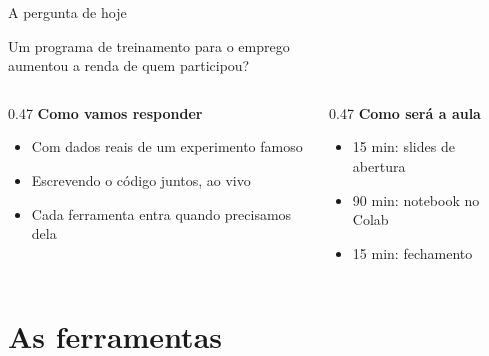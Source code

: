 \documentclass[aspectratio=169,11pt]{beamer}
\begin{document}
\maketitle

\begin{frame}{A pergunta de hoje}
  \begin{center}
    \Large Um programa de treinamento para o emprego\\
    \alert{aumentou a renda} de quem participou?
  \end{center}
  \bigskip
  \begin{columns}[T]
    \begin{column}{0.47\textwidth}
      \textbf{Como vamos responder}
      \begin{itemize}
        \item Com dados reais de um experimento famoso
        \item Escrevendo o código \alert{juntos, ao vivo}
        \item Cada ferramenta entra quando precisamos dela
      \end{itemize}
    \end{column}
    \begin{column}{0.47\textwidth}
      \textbf{Como será a aula}
      \begin{itemize}
        \item[\textcolor{tmlblue}{\textbullet}] 15 min: slides de abertura
        \item[\textcolor{tmlaccent}{\textbullet}] 90 min: notebook no Colab
        \item[\textcolor{tmlgreen}{\textbullet}] 15 min: fechamento
      \end{itemize}
    \end{column}
  \end{columns}
\end{frame}

\section{As ferramentas}
\end{document}
